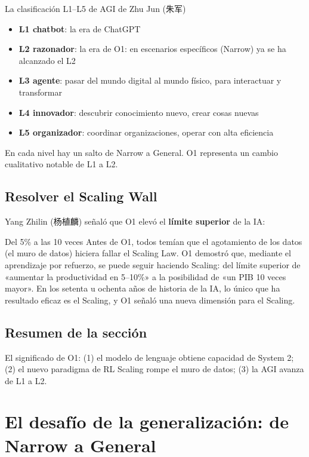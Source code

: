 \documentclass[a4paper]{article}
\begin{document}
\begin{knowledgebox}{La clasificación L1--L5 de AGI de Zhu Jun (朱军)}
\begin{itemize}
\item \textbf{L1 chatbot}: la era de ChatGPT
\item \textbf{L2 razonador}: la era de O1: en escenarios específicos (Narrow) ya se ha alcanzado el L2
\item \textbf{L3 agente}: pasar del mundo digital al mundo físico, para interactuar y transformar
\item \textbf{L4 innovador}: descubrir conocimiento nuevo, crear cosas nuevas
\item \textbf{L5 organizador}: coordinar organizaciones, operar con alta eficiencia
\end{itemize}
En cada nivel hay un salto de Narrow a General. O1 representa un cambio cualitativo notable de L1 a L2.
\end{knowledgebox}

\subsection{Resolver el Scaling Wall}

Yang Zhilin (杨植麟) señaló que O1 elevó el \textbf{límite superior} de la IA:

\begin{importantbox}{Del 5\% a las 10 veces}
Antes de O1, todos temían que el agotamiento de los datos (el muro de datos) hiciera fallar el Scaling Law. O1 demostró que, mediante el aprendizaje por refuerzo, se puede seguir haciendo Scaling: del límite superior de «aumentar la productividad en 5--10\%» a la posibilidad de «un PIB 10 veces mayor». En los setenta u ochenta años de historia de la IA, lo único que ha resultado eficaz es el Scaling, y O1 señaló una nueva dimensión para el Scaling.
\end{importantbox}

\subsection{Resumen de la sección}

El significado de O1: (1) el modelo de lenguaje obtiene capacidad de System 2; (2) el nuevo paradigma de RL Scaling rompe el muro de datos; (3) la AGI avanza de L1 a L2.

\section{El desafío de la generalización: de Narrow a General}
\end{document}
